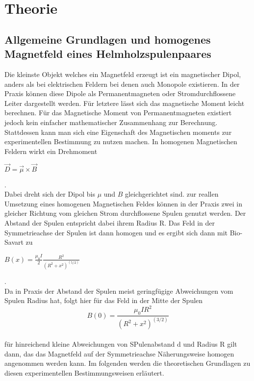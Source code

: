 \section{Theorie}
\subsection{Allgemeine Grundlagen und homogenes Magnetfeld eines Helmholzspulenpaares}
Die kleinste Objekt welches ein Magnetfeld erzeugt ist ein magnetischer Dipol, anders als bei elektrischen Feldern bei denen auch Monopole existieren. In der Praxis können
diese Dipole als Permanentmagneten oder Stromdurchflossene Leiter dargestellt werden. Für letztere lässt sich das magnetische Moment leicht berechnen.
Für das Magnetische Moment von Permanentmagneten existiert jedoch kein einfacher mathematischer Zusammenhang zur Berechnung. Stattdessen kann man sich eine Eigenschaft des Magnetischen moments 
zur experimentellen Bestimmung zu nutzen machen. In homogenen Magnetischen Feldern wirkt ein Drehmoment \\

\begin{centering}

   $ \vec{D} = \vec{\mu} \times \vec{B}$ %

\end{centering}.
\\
Dabei dreht sich der Dipol bis $\mu$ und $B$ gleichgerichtet sind.
zur reallen Umsetzung eines homogenen Magnetischen Feldes können in der Praxis zwei in gleicher Richtung vom gleichen Strom durchflossene Spulen genutzt werden. Der Abstand 
der Spulen entspricht dabei ihrem Radius R. Das Feld in der Symmetrieachse der Spulen ist dann homogen und es ergibt sich dann mit Bio-Savart zu \\

\begin{centering}

$B(x)= \frac{\mu_{0}I}{2}\frac{R^2}{(R^2 + x^2)^{(5/2)}}$

\end{centering}.\\

Da in Praxis der Abstand der Spulen meist geringfügige Abweichungen vom Spulen Radius hat, folgt hier für das Feld in der Mitte der Spulen\\
\begin{equation}
 B(0)=\frac{\mu_{0}IR^2}{(R^2 + x^2)^{(3/2)}}
 \label{eqn:Bio1}
\end{equation}\\
für hinreichend  kleine Abweichungen von SPulenabstand d und Radius R gilt dann, das das Magnetfeld auf der Symmetrieachse Näherungsweise homogen angenommen werden kann.
Im folgenden werden die theoretischen Grundlagen zu diesen experimentellen Bestimmungsweisen erläutert.
